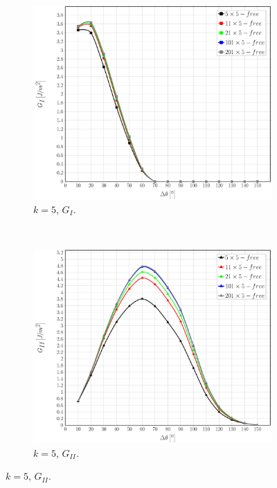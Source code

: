 \documentclass[review]{elsarticle}
\begin{document}
\begin{figure}[!h]
    \begin{subfigure}[b]{0.475\textwidth}
        \includegraphics[width=\textwidth]{sideabovefibers-t5-vf60-GI.pdf}
        \caption{$k=5$, $G_{I}$.}\label{subfig:sideabovefiber60MIt5}
    \end{subfigure} ~
    \begin{subfigure}[b]{0.475\textwidth}
        \includegraphics[width=\textwidth]{sideabovefibers-t5-vf60-GII.pdf}
        \caption{$k=5$, $G_{II}$.}\label{subfig:sideabovefiber60MIIt5}
    \end{subfigure}
    

\end{figure}
\end{document}
